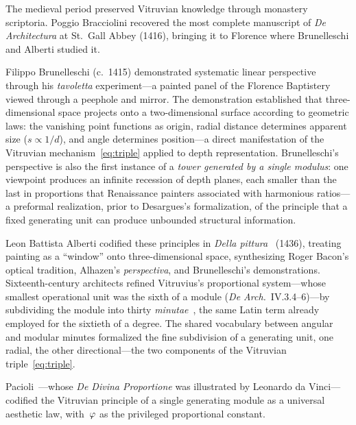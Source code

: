 The medieval period preserved Vitruvian knowledge through monastery
scriptoria.  Poggio Bracciolini recovered the most complete manuscript
of \emph{De Architectura} at St.~Gall Abbey (1416), bringing it
to Florence where Brunelleschi and Alberti studied it.

Filippo Brunelleschi (c.~1415) demonstrated systematic linear
perspective through his \emph{tavoletta} experiment---a painted panel of
the Florence Baptistery viewed through a peephole and mirror.  The
demonstration established that three-dimensional space projects onto a
two-dimensional surface according to geometric laws: the vanishing
point functions as origin, radial distance determines apparent size
($s \propto 1/d$), and angle determines position---a direct
manifestation of the Vitruvian mechanism~\cref{eq:triple} applied to
depth representation.  Brunelleschi's perspective is also the first
instance of a \emph{tower generated by a single modulus}: one
viewpoint produces an infinite recession of depth planes, each
smaller than the last in proportions that Renaissance painters
associated with harmonious ratios---a preformal realization,
prior to Desargues's formalization, of the principle that a fixed
generating unit can produce unbounded structural information.

Leon Battista Alberti codified these principles in \emph{Della pittura}~\cite{alberti}
(1436), treating painting as a ``window'' onto three-dimensional space,
synthesizing Roger Bacon's optical tradition, Alhazen's
\emph{perspectiva}, and Brunelleschi's demonstrations.  Sixteenth-century
architects refined Vitruvius's proportional system---whose smallest
operational unit was the sixth of a module
(\emph{De Arch.}~IV.3.4--6)---by subdividing the module into thirty
\emph{minutae}~\cite{harthicks98}, the same Latin term already
employed for the sixtieth of a degree.  The shared vocabulary between
angular and modular minutes formalized the fine subdivision of a
generating unit, one radial, the other directional---the two
components of the Vitruvian triple~\cref{eq:triple}.

Pacioli~\cite{pacioli1509}---whose \emph{De Divina Proportione} was
illustrated by Leonardo da Vinci---codified the Vitruvian principle of
a single generating module as a universal aesthetic law, with~$\varphi$
as the privileged proportional constant.

